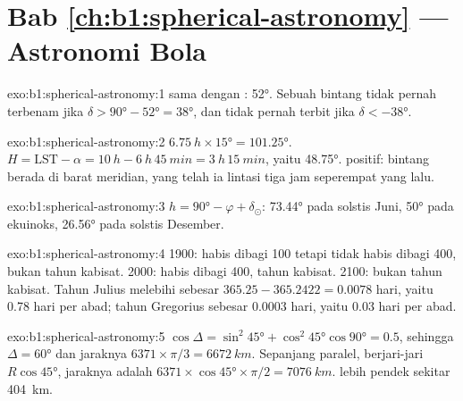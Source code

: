 \section*{Bab \ref{ch:b1:spherical-astronomy} --- Astronomi Bola}

\begin{solution}{exo:b1:spherical-astronomy:1}
 sama dengan : \ang{52}. Sebuah bintang tidak pernah terbenam jika
$\delta > \ang{90} - \ang{52} = \ang{38}$, dan tidak pernah terbit jika
$\delta < \ang{-38}$.
\end{solution}

\begin{solution}{exo:b1:spherical-astronomy:2}
$\qty{6.75}{h}\times\ang{15} = \ang{101.25}$. $H = \mathrm{LST} - \alpha =
\qty{10}{h} - \qty{6}{h}\,\qty{45}{min} = \qty{3}{h}\,\qty{15}{min}$, yaitu
\ang{48.75}.  positif: bintang berada di barat meridian, yang telah ia lintasi tiga jam seperempat  yang lalu.
\end{solution}

\begin{solution}{exo:b1:spherical-astronomy:3}
$h = \ang{90} - \varphi + \delta_\odot$: \ang{73.44} pada solstis Juni, \ang{50} pada ekuinoks, \ang{26.56} pada solstis Desember.
\end{solution}

\begin{solution}{exo:b1:spherical-astronomy:4}
1900: habis dibagi 100 tetapi tidak habis dibagi 400, bukan tahun kabisat. 2000: habis dibagi 400, tahun kabisat. 2100: bukan tahun kabisat. Tahun Julius melebihi  sebesar $365.25 - 365.2422 = 0.0078$ hari, yaitu \num{0.78} hari per abad; tahun Gregorius sebesar $0.0003$ hari, yaitu \num{0.03} hari per abad.
\end{solution}

\begin{solution}{exo:b1:spherical-astronomy:5}
$\cos\Delta = \sin^2\ang{45} + \cos^2\ang{45}\cos\ang{90} = 0.5$, sehingga
$\Delta = \ang{60}$ dan jaraknya $6371\times\pi/3 = \qty{6672}{km}$.
Sepanjang paralel,  berjari-jari $R\cos\ang{45}$, jaraknya adalah
$6371\times\cos\ang{45}\times\pi/2 = \qty{7076}{km}$.  lebih
pendek sekitar \qty{404}{km}.
\end{solution}

